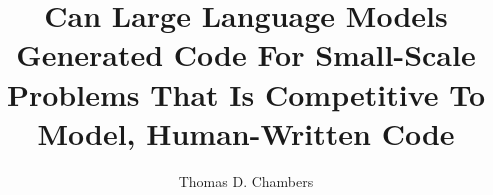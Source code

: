 \documentclass[manuscript,screen,review,sigconf]{acmart}
\begin{document}
\title{Can Large Language Models Generated Code For Small-Scale Problems That Is Competitive To Model, Human-Written Code}

\author{Thomas D. Chambers}

\renewcommand{\shortauthors}{Trovato and Tobin, et al.}



\begin{CCSXML}

\end{CCSXML}




\maketitle
\end{document}
